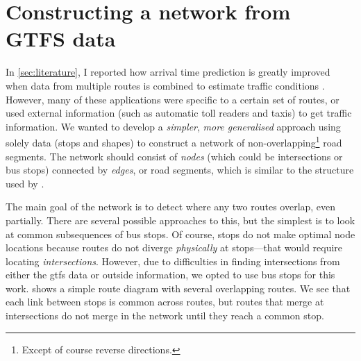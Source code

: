 

\section{Constructing a network from GTFS data}
\label{sec:route-segments}

In \cref{sec:literature}, I reported how arrival time prediction is greatly improved when data from multiple routes is combined to estimate traffic conditions \citep{Yu_2011}. However, many of these applications were specific to a certain set of routes, or used external information (such as automatic toll readers and taxis) to get \rt{} traffic information. We wanted to develop a \emph{simpler}, \emph{more generalised} approach using solely \GTFS{} data (stops and shapes) to construct a network of non-overlapping\footnote{Except of course reverse directions.} road segments. The network should consist of \emph{nodes} (which could be intersections or bus stops) connected by \emph{edges}, or road segments, which is similar to the structure used by \citet{Celan_2017,Vuurstaek_2018}.


The main goal of the network is to detect where any two routes overlap, even partially. There are several possible approaches to this, but the simplest is to look at common subsequences of bus stops. Of course, stops do not make optimal node locations because routes do not diverge \emph{physically} at stops---that would require locating \emph{intersections}. However, due to difficulties in finding intersections from either the \gls{gtfs} data or outside information, we opted to use bus stops for this work.  shows a simple route diagram with several overlapping routes. We see that each link between stops is common across routes, but routes that merge at intersections do not merge in the network until they reach a common stop.


